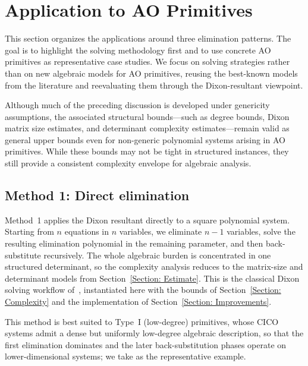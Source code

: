 \section{Application to AO Primitives}\label{Section:Application}

This section organizes the applications around three elimination patterns. The goal is to highlight the solving methodology first and to use concrete AO primitives as representative case studies. We focus on solving strategies rather than on new algebraic models for AO primitives, reusing the best-known models from the literature and reevaluating them through the Dixon-resultant viewpoint.

\begin{remark}
	Although much of the preceding discussion is developed under genericity assumptions, the associated structural bounds---such as degree bounds, Dixon matrix size estimates, and determinant complexity estimates---remain valid as general upper bounds even for non-generic polynomial systems arising in AO primitives. While these bounds may not be tight in structured instances, they still provide a consistent complexity envelope for algebraic analysis.
\end{remark}

\subsection{Method 1: Direct elimination}\label{subsec:method1}
Method~1 applies the Dixon resultant directly to a square polynomial system. Starting from $n$ equations in $n$ variables, we eliminate $n-1$ variables, solve the resulting elimination polynomial in the remaining parameter, and then back-substitute recursively. The whole algebraic burden is concentrated in one structured determinant, so the complexity analysis reduces to the matrix-size and determinant models from Section~\ref{Section: Estimate}. This is the classical Dixon solving workflow of~\cite{cryptoeprint:2005/312,Albrecht2008}, instantiated here with the bounds of Section~\ref{Section: Complexity} and the implementation of Section~\ref{Section: Improvements}.

This method is best suited to Type~I (low-degree) primitives, whose CICO systems admit a dense but uniformly low-degree algebraic description, so that the first elimination dominates and the later back-substitution phases operate on lower-dimensional systems; we take \poseidon as the representative example.

